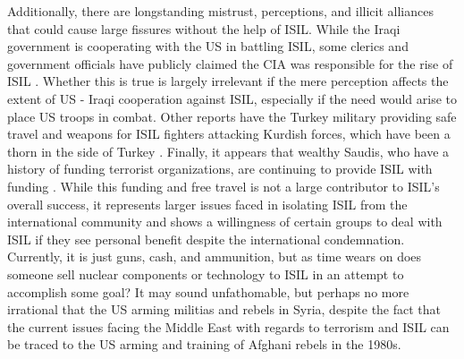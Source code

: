 \documentclass{report}
\begin{document}
Additionally, there are longstanding mistrust, perceptions, and illicit alliances that could cause large fissures  without the help of ISIL.  While the Iraqi government is cooperating with the US in battling ISIL, some clerics and government officials have publicly claimed the CIA was responsible for the rise of ISIL \cite{Kirkpatrick2014}.  Whether this is true is largely irrelevant if the mere perception affects the extent of US - Iraqi cooperation against ISIL, especially if the need would arise to place US troops in combat.  Other reports have the Turkey military providing safe travel and weapons for ISIL fighters attacking Kurdish forces, which have been a thorn in the side of Turkey \cite{Guiton2014}.  Finally, it appears that wealthy Saudis, who have a history of funding terrorist organizations, are continuing to provide ISIL with funding \cite{Windrem2014}. While this funding and free travel is not a large contributor to ISIL’s overall success, it represents larger issues faced in isolating ISIL from the international community and shows a willingness of certain groups to deal with ISIL if they see personal benefit despite the international condemnation.  Currently, it is just guns, cash, and ammunition, but as time wears on does someone sell nuclear components or technology to ISIL in an attempt to accomplish some goal?  It may sound unfathomable, but perhaps no more irrational that the US arming militias and rebels in Syria, despite the fact that the current issues facing the Middle East with regards to terrorism and ISIL can be traced to the US arming and training of Afghani rebels in the 1980s. 

\end{document}
